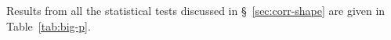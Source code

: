 Results from all the statistical tests discussed in \S~\ref{sec:corr-shape} are given in Table~\ref{tab:big-p}.  





